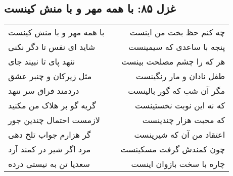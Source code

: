 \begin{center}
\section*{غزل ۸۵: با همه مهر و با منش کینست}
\label{sec:085}
\begin{longtable}{l p{0.5cm} r}
با همه مهر و با منش کینست
&&
چه کنم حظ بخت من اینست
\\
شاید ای نفس تا دگر نکنی
&&
پنجه با ساعدی که سیمینست
\\
ننهد پای تا نبیند جای
&&
هر که را چشم مصلحت بینست
\\
مثل زیرکان و چنبر عشق
&&
طفل نادان و مار رنگینست
\\
دردمند فراق سر ننهد
&&
مگر آن شب که گور بالینست
\\
گریه گو بر هلاک من مکنید
&&
که نه این نوبت نخستینست
\\
لازمست احتمال چندین جور
&&
که محبت هزار چندینست
\\
گر هزارم جواب تلخ دهی
&&
اعتقاد من آن که شیرینست
\\
مرد اگر شیر در کمند آرد
&&
چون کمندش گرفت مسکینست
\\
سعدیا تن به نیستی درده
&&
چاره با سخت بازوان اینست
\\
\end{longtable}
\end{center}
